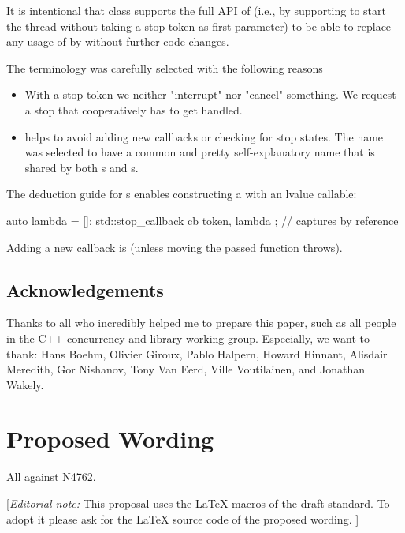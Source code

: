 It is intentional that class  supports the full API of 
(i.e., by supporting to start the thread without taking a stop token as first parameter)
to be able to replace any usage of  by 
without further code changes.

The terminology was carefully selected with the following reasons
\begin{itemize}
 \item With a stop token we neither "interrupt" nor "cancel" something.
        We request a stop that cooperatively has to get handled.
 \item {} helps to avoid adding new callbacks
        or checking for stop states.
        The name was selected to have a common and pretty self-explanatory name
        that is shared by both s and s.
\end{itemize}

The deduction guide for s enables
constructing a  with an lvalue callable:
\begin{codeblock}
auto lambda = []{};
std::stop_callback cb{ token, lambda };  // captures by reference
\end{codeblock}

Adding a new callback is  (unless moving the passed function throws).

\subsection*{Acknowledgements}

Thanks to all who incredibly helped me to prepare this paper, such as all people in the C++ concurrency and library working group.
Especially, we want to thank:
 Hans Boehm, Olivier Giroux, Pablo Halpern, Howard Hinnant, Alisdair Meredith, Gor Nishanov,
 Tony Van Eerd, Ville Voutilainen, and Jonathan Wakely.

\section*{Proposed Wording}
All against N4762.

{\color{blue}
[{\itshape{}Editorial note:} This proposal uses the LaTeX macros of the draft standard.
        To adopt it please ask for the LaTeX source code of the proposed wording. ]
}


